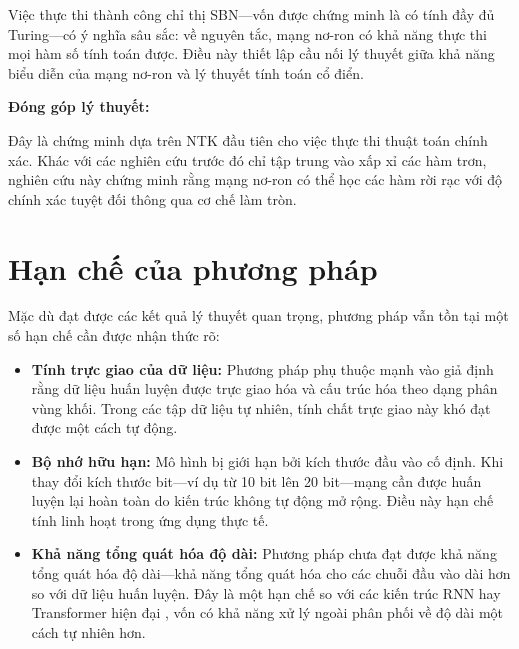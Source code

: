 \vspace{0.2cm}

Việc thực thi thành công chỉ thị SBN---vốn được chứng minh là có tính đầy đủ Turing---có ý nghĩa sâu sắc: về nguyên tắc, mạng nơ-ron có khả năng thực thi mọi hàm số tính toán được. Điều này thiết lập cầu nối lý thuyết giữa khả năng biểu diễn của mạng nơ-ron và lý thuyết tính toán cổ điển.

\vspace{0.2cm}

\textbf{Đóng góp lý thuyết:}

\vspace{0.2cm}

Đây là chứng minh dựa trên NTK đầu tiên cho việc thực thi thuật toán chính xác. Khác với các nghiên cứu trước đó chỉ tập trung vào xấp xỉ các hàm trơn, nghiên cứu này chứng minh rằng mạng nơ-ron có thể học các hàm rời rạc với độ chính xác tuyệt đối thông qua cơ chế làm tròn.

\section{Hạn chế của phương pháp}

Mặc dù đạt được các kết quả lý thuyết quan trọng, phương pháp vẫn tồn tại một số hạn chế cần được nhận thức rõ:

\begin{itemize}
    \item \textbf{Tính trực giao của dữ liệu:} Phương pháp phụ thuộc mạnh vào giả định rằng dữ liệu huấn luyện được trực giao hóa và cấu trúc hóa theo dạng phân vùng khối. Trong các tập dữ liệu tự nhiên, tính chất trực giao này khó đạt được một cách tự động.
    
    \item \textbf{Bộ nhớ hữu hạn:} Mô hình bị giới hạn bởi kích thước đầu vào cố định. Khi thay đổi kích thước bit---ví dụ từ 10 bit lên 20 bit---mạng cần được huấn luyện lại hoàn toàn do kiến trúc không tự động mở rộng. Điều này hạn chế tính linh hoạt trong ứng dụng thực tế.
    
    \item \textbf{Khả năng tổng quát hóa độ dài:} Phương pháp chưa đạt được khả năng tổng quát hóa độ dài---khả năng tổng quát hóa cho các chuỗi đầu vào dài hơn so với dữ liệu huấn luyện. Đây là một hạn chế so với các kiến trúc RNN hay Transformer hiện đại \cite{vaswani_2017}, vốn có khả năng xử lý ngoài phân phối về độ dài một cách tự nhiên hơn.
\end{itemize}

